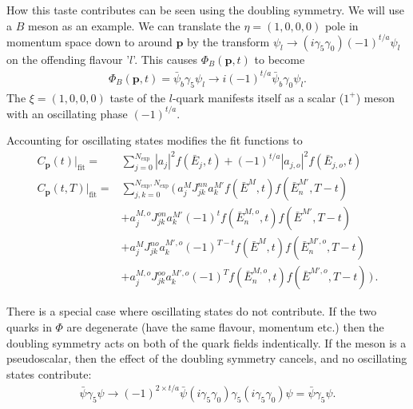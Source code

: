 How this taste contributes can be seen using the doubling symmetry. We will use a $B$ meson as an example. We can translate the $\eta=(1,0,0,0)$ pole in momentum space down to around ${\textbf{p}}$ by the transform $\psi_l\to (i\gamma_5\gamma_0)(-1)^{t/a} \psi_l$ on the offending flavour '$l$'. This causes $\Phi_B({\textbf{p}},t)$ to become
\begin{align}
  \Phi_B({\textbf{p}},t) = \bar{\psi}_b\gamma_5\psi_l \to i(-1)^{t/a}\bar{\psi}_b\gamma_0\psi_l.
\end{align}
The $\xi=(1,0,0,0)$ taste of the $l$-quark manifests itself as a scalar ($1^+$) meson with an oscillating phase $(-1)^{t/a}$.

Accounting for oscillating states modifies the fit functions to
\begin{align}
  \label{eq:2ptcorrelator_real}
  C_{\textbf{p}}(t)|_{\text{fit}} =& \sum_{j=0}^{N_{\text{exp}}} |a_j|^2 f(\bar{E}_j,t) + (-1)^{t/a} |a_{j,o}|^2 f(\bar{E}_{j,o},t)\, \\
  \nonumber
  C_{\textbf{p}}(t,T)|_{\text{fit}} =& \sum_{j,k=0}^{N_{\text{exp}},N_{\text{exp}}} \Big(\, a^{M}_j J^{nn}_{jk} a^{M'}_k f(\bar{E}^{M},t) f(\bar{E}^{M'}_n,T-t)
  \\ \nonumber
  &+a^{M,o}_j J^{on}_{jk} a^{M'}_k (-1)^t f(\bar{E}^{M,o}_n,t) f(\bar{E}^{M'},T-t)
  \\ \nonumber
  &+a^{M}_j J^{no}_{jk} a^{M',o}_k (-1)^{T-t} f(\bar{E}^{M},t) f(\bar{E}^{M',o}_n,T-t)
  \\
  &+a^{M,o}_j J^{oo}_{jk} a^{M',o}_k (-1)^T f(\bar{E}^{M,o}_n,t) f(\bar{E}^{M',o},T-t) \,\Big)\,.
  \label{eq:3ptcorrelator_real}
\end{align}

There is a special case where oscillating states do not contribute. If the two quarks in $\Phi$ are degenerate (have the same flavour, momentum etc.) then the doubling symmetry acts on both of the quark fields indentically. If the meson is a pseudoscalar, then the effect of the doubling symmetry cancels, and no oscillating states contribute:
\begin{align}
  \bar{\psi}\gamma_5 \psi \to (-1)^{2\times t/a} \bar{\psi} (i\gamma_5\gamma_0) \gamma_5 (i\gamma_5\gamma_0) \psi = \bar{\psi}\gamma_5\psi.
\end{align}


